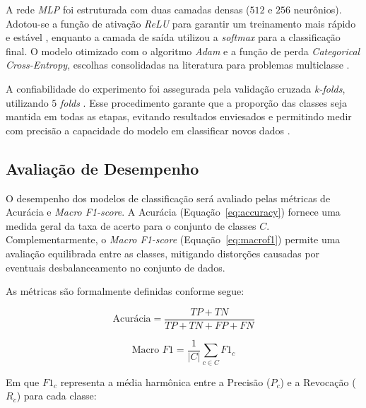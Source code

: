 A rede \textit{MLP} foi estruturada com duas camadas densas ($512$ e $256$ neurônios). Adotou-se a função de ativação \textit{ReLU}
para garantir um treinamento mais rápido e estável \cite{Zhang}, enquanto a camada de saída utilizou a \textit{softmax} para a 
classificação final. O modelo otimizado com o algoritmo \textit{Adam} e a função de perda
\textit{Categorical Cross-Entropy}, escolhas consolidadas na literatura para problemas multiclasse \cite{goodfellow2016deep}.

A confiabilidade do experimento foi assegurada pela validação cruzada \textit{k-folds}, utilizando $5$ \textit{folds} . Esse procedimento garante que a proporção das classes
seja mantida em todas as etapas, evitando resultados enviesados e permitindo medir com precisão a capacidade do modelo em classificar novos dados \cite{brink2016real}.

\subsection{Avaliação de Desempenho}

O desempenho dos modelos de classificação será avaliado pelas métricas de Acurácia e \textit{Macro F1-score}.
A Acurácia (Equação~\ref{eq:accuracy}) fornece uma medida geral da taxa de acerto para o conjunto de classes $C$.
Complementarmente, o \textit{Macro F1-score} (Equação~\ref{eq:macrof1}) permite uma avaliação equilibrada entre as
classes, mitigando distorções causadas por eventuais desbalanceamento no conjunto de dados.

As métricas são formalmente definidas conforme segue:

\noindent
\begin{minipage}{0.50\linewidth}
\begin{equation}\label{eq:accuracy}
\text{Acurácia} = \frac{TP + TN}{TP + TN + FP + FN}
\end{equation}
\end{minipage}\hfill
\begin{minipage}{0.48\linewidth}
\begin{equation}\label{eq:macrof1}
\text{Macro } F1 = \frac{1}{|C|} \sum_{c \in C} F1_c
\end{equation}
\end{minipage}

Em que $F1_c$ representa a média harmônica entre a Precisão ($P_c$) e a Revocação ($R_c$) para cada classe:


